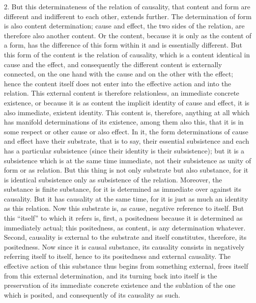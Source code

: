 2. But this determinateness of the relation of causality,
that content and form are different
and indifferent to each other,
extends further.
The determination of form is also content determination;
cause and effect, the two sides of the relation,
are therefore also another content.
Or the content, because it is only as the content of a form,
has the difference of this form within it
and is essentially different.
But this form of the content is the
relation of causality,
which is a content identical
in cause and the effect,
and consequently the different content is externally connected,
on the one hand with the cause
and on the other with the effect;
hence the content itself does not enter into
the effective action and into the relation.
This external content is therefore relationless,
an immediate concrete existence,
or because it is as content
the implicit identity of cause and effect,
it is also immediate, existent identity.
This content is, therefore, anything at all
which has manifold determinations of its existence,
among them also this, that it is
in some respect or other cause or also effect.
In it, the form determinations of cause and effect
have their substrate, that is to say,
their essential subsistence
and each has a particular subsistence
(since their identity is their subsistence);
but it is a subsistence which is at the same time immediate,
not their subsistence as unity of form or as relation.
But this thing is not only substrate but also substance,
for it is identical subsistence only as subsistence of the relation.
Moreover, the substance is finite substance,
for it is determined as immediate over against its causality.
But it has causality at the same time,
for it is just as much an identity as this relation.
Now this substrate is, as cause,
negative reference to itself.
But this “itself” to which it refers is,
first, a positedness because it is determined as immediately actual;
this positedness, as content, is any determination whatever.
Second, causality is external to the substrate
and itself constitutes, therefore, its positedness.
Now since it is causal substance,
its causality consists in negatively referring itself to itself,
hence to its positedness and external causality.
The effective action of this substance thus
begins from something external,
frees itself from this external determination,
and its turning back into itself is
the preservation of its immediate concrete existence
and the sublation of the one which is posited,
and consequently of its causality as such.

